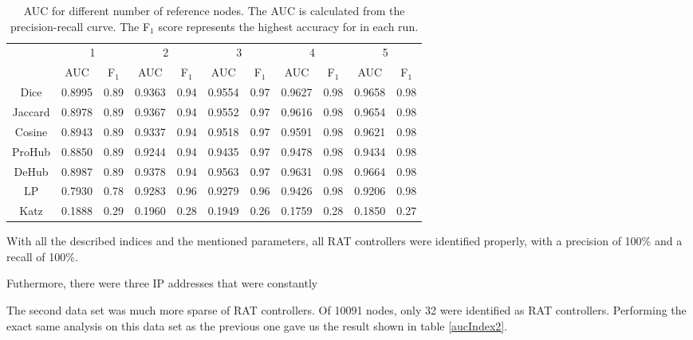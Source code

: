 \begin{table}[h!]
    \centering
    \caption{AUC for different number of reference nodes. The AUC is calculated from the precision-recall curve. The F$_1$ score represents the highest accuracy for in each run.}
    \begin{tabular}{|c||c|c||c|c||c|c||c|c||c|c|}
      \hline
      \multirow{2}{*}{~} 
            & \multicolumn{2}{c||}{1}
            & \multicolumn{2}{c||}{2}
            & \multicolumn{2}{c||}{3}
            & \multicolumn{2}{c||}{4}
            & \multicolumn{2}{|c|}{5} \\             \cline{2-11}
      ~     &AUC&F$_1$&AUC&F$_1$&AUC&F$_1$&AUC&F$_1$&AUC&F$_1$ \\ \hline
    Dice    &0.8995 & 0.89 & 0.9363 &0.94 &0.9554&0.97 & 0.9627 &0.98&0.9658 & 0.98 \\
    Jaccard &0.8978 & 0.89 & 0.9367 &0.94 &0.9552&0.97 & 0.9616 &0.98&0.9654 & 0.98 \\
    Cosine  &0.8943 & 0.89 & 0.9337 &0.94 &0.9518&0.97 & 0.9591 &0.98&0.9621 & 0.98 \\
    ProHub  &0.8850 & 0.89 & 0.9244 &0.94 &0.9435&0.97 & 0.9478 &0.98&0.9434 & 0.98 \\
    DeHub   &0.8987 & 0.89 & 0.9378 &0.94 &0.9563&0.97 & 0.9631 &0.98&0.9664 & 0.98 \\
    LP      & 0.7930 & 0.78 & 0.9283 & 0.96 & 0.9279 & 0.96 & 0.9426 & 0.98 & 0.9206 & 0.98 \\ 
    Katz    & 0.1888 & 0.29 & 0.1960 & 0.28 & 0.1949 & 0.26 & 0.1759 & 0.28 & 0.1850 & 0.27 \\ \hline
    \end{tabular}
    \label{aucIndex}
\end{table}


With all the described indices and the mentioned parameters, all RAT controllers were identified properly, with a precision of 100\% and a recall of 100\%.

Futhermore, there were three IP addresses that were constantly 

    
The second data set was much more sparse of RAT controllers. Of 10091 nodes, only 32 were identified as RAT controllers. Performing the exact same analysis on this data set as the previous one gave us the result shown in table \ref{aucIndex2}.

